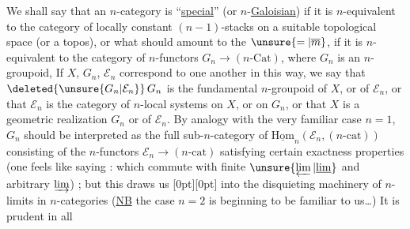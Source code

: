 %
We shall say that an $n$-category  is ``\uline{special}'' (or $n$-\uline{Galoisian}) if it is $n$-equivalent to the category of locally constant $(n-1)$-stacks on a suitable topological space (or a topos), or what should amount to the $\unsure{=|\overline m}$, if it is $n$-equivalent to the category of $n$-functors $G_n\longrightarrow(n\text{-}\mathrm{Cat})$, where $G_n$ is an $n$-groupoid, If $X$, $G_n$, $\mathcal E_n$ correspond to one another in this way, we say that $\deleted{\unsure{G_n|\mathcal E_n}}\,G_n$ is the fundamental $n$-groupoid of $X$, or of $\mathcal E_n$, or that $\mathcal E_n$ is the category of $n$-local systems on $X$, or on $G_n$, or that $X$ is a geometric realization  $G_n$ or of $\mathcal E_n$. By analogy with the very familiar case $n=1$, $G_n$ should be interpreted as the full sub-$n$-category of $\underline{\mathrm{Hom}}_n(\mathcal E_n,(n\text{-}\mathrm{cat}))$ consisting of the $n$-functors $\mathcal E_n\to(n\text{-}\mathrm{cat})$ satisfying certain exactness properties (one feels like saying : which commute with finite $\unsure{\varprojlim|\underline{\lim}}$ and arbitrary $\varinjlim$) ; but this draws us
\raisebox{-1.8ex}[0pt][0pt]{}
 into the disquieting machinery of $n$-limits in $n$-categories (\uline{NB} the case $n=2$ is beginning to be familiar to us\ldots) It is prudent in all
